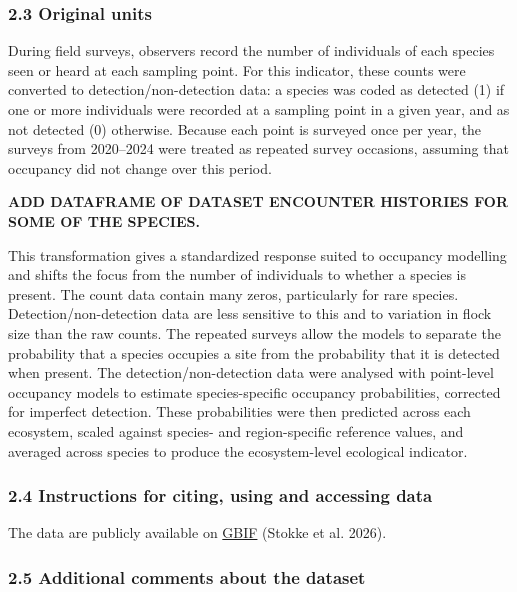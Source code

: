 \documentclass[
  letterpaper,
  DIV=11,
  numbers=noendperiod]{scrartcl}
\begin{document}
\subsubsection{2.3 Original units}\label{original-units}

During field surveys, observers record the number of individuals of each
species seen or heard at each sampling point. For this indicator, these
counts were converted to detection/non-detection data: a species was
coded as detected (1) if one or more individuals were recorded at a
sampling point in a given year, and as not detected (0) otherwise.
Because each point is surveyed once per year, the surveys from
2020--2024 were treated as repeated survey occasions, assuming that
occupancy did not change over this period.

\textbf{ADD DATAFRAME OF DATASET ENCOUNTER HISTORIES FOR SOME OF THE
SPECIES.}

This transformation gives a standardized response suited to occupancy
modelling and shifts the focus from the number of individuals to whether
a species is present. The count data contain many zeros, particularly
for rare species. Detection/non-detection data are less sensitive to
this and to variation in flock size than the raw counts. The repeated
surveys allow the models to separate the probability that a species
occupies a site from the probability that it is detected when present.
The detection/non-detection data were analysed with point-level
occupancy models to estimate species-specific occupancy probabilities,
corrected for imperfect detection. These probabilities were then
predicted across each ecosystem, scaled against species- and
region-specific reference values, and averaged across species to produce
the ecosystem-level ecological indicator.

\subsubsection{2.4 Instructions for citing, using and accessing
data}\label{instructions-for-citing-using-and-accessing-data}

The data are publicly available on
\href{https://www.gbif.org/dataset/4a00502d-6342-4294-aad1-9727e5c24041}{GBIF}
(Stokke et al. 2026).

\subsubsection{2.5 Additional comments about the
dataset}\label{additional-comments-about-the-dataset}
\end{document}
